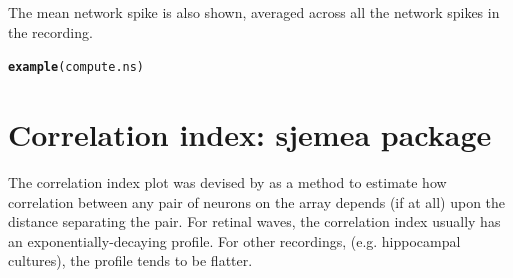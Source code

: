 \documentclass{article}\usepackage[]{graphicx}\usepackage[]{color}
\makeatletter
\newcommand{\hlstd}[1]{\textcolor[rgb]{0.345,0.345,0.345}{#1}}%
\newcommand{\hlkwd}[1]{\textcolor[rgb]{0.737,0.353,0.396}{\textbf{#1}}}%
\newenvironment{kframe}{%
 \def\at@end@of@kframe{}%
 \ifinner\ifhmode%
  \def\at@end@of@kframe{\end{minipage}}%
  \begin{minipage}{\columnwidth}%
 \fi\fi%
 \def\FrameCommand##1{\hskip\@totalleftmargin \hskip-\fboxsep
 \colorbox{shadecolor}{##1}\hskip-\fboxsep
     \hskip-\linewidth \hskip-\@totalleftmargin \hskip\columnwidth}%
 \MakeFramed {\advance\hsize-\width
   \@totalleftmargin\z@ \linewidth\hsize
   \@setminipage}}%
 {\par\unskip\endMakeFramed%
 \at@end@of@kframe}
\newenvironment{knitrout}{}{} %
\makeatother
\begin{document}
The mean network spike is also shown, averaged across all the network
spikes in the recording.

\begin{knitrout}
\color{fgcolor}\begin{kframe}
\begin{alltt}
\hlkwd{example}\hlstd{(compute.ns)}
\end{alltt}
\end{kframe}
\end{knitrout}


\section*{Correlation index: sjemea package}

The correlation index plot was devised by \citet{Wong1993} as a method to
estimate how correlation between any pair of neurons on the array
depends (if at all) upon the distance separating the pair.  For
retinal waves, the correlation index usually has an
exponentially-decaying profile.  For other recordings,
(e.g. hippocampal cultures), the profile tends to be flatter.
\end{document}
